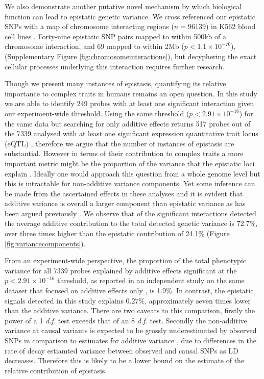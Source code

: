 \documentclass{article}
\begin{document}
We also demonstrate another putative novel mechanism by which biological function can lead to epistatic genetic variance. We cross referenced our epistatic SNPs with a map of chromosome interacting regions ($n = 96139$) in K562 blood cell lines \cite{Lan2012}. Forty-nine epistatic SNP pairs mapped to within 500kb of a chromosome interaction, and 69 mapped to within 2Mb ($p < 1.1 \times 10^{-70}$), (Supplementary Figure \ref{fig:chromosomeinteractions}), but decyphering the exact cellular processes underlying this interaction requires further research.


Though we present many instances of epistasis, quantifying its relative importance to complex traits in humans remains an open question. In this study we are able to identify 249 probes with at least one significant interaction given our experiment-wide threshold. Using the same threshold ($p < 2.91 \times 10^{-16}$) for the same data but searching for only additive effects returns 517 probes out of the 7339 analysed with at least one significant expression quantitative trait locus (eQTL) \cite{Powell2012}, therefore we argue that the number of instances of epistasis are substantial. However in terms of their contribution to complex traits a more important metric might be the proportion of the variance that the epistatic loci explain \cite{Hill2008a}. Ideally one would approach this question from a whole genome level \cite{Visscher2008} but this is intractable for non-additive variance components. Yet some inference can be made from the ascertained effects in these analyses and it is evident that additive variance is overall a larger component than epistatic variance as has been argued previously \cite{Hill2008a, Crow2010}. We observe that of the significant interactions detected the average additive contribution to the total detected genetic variance is 72.7\%, over three times higher than the epistatic contribution of 24.1\% (Figure \ref{fig:variancecomponents}).

From an experiment-wide perspective, the proportion of the total phenotypic variance for all 7339 probes explained by additive effects significant at the $p < 2.91 \times 10^{-16}$ threshold, as reported in an independent study on the same dataset that focused on additive effects only \cite{Powell2012}, is 1.9\%. In contrast, the epistatic signals detected in this study explains 0.27\%, approximately seven times lower than the additive variance. There are two caveats to this comparison, firstly the power of a 1 \emph{d.f.} test exceeds that of an 8 \emph{d.f.} test. Secondly the non-additive variance at causal variants is expected to be grossly underestimated by observed SNPs in comparison to estimates for additive variance \cite{Weir2008, Hemani2013}, due to differences in the rate of decay estiamted variance between observed and causal SNPs as LD decreases. Therefore this is likely to be a lower bound on the estimate of the relative contribution of epistasis.
\end{document}
